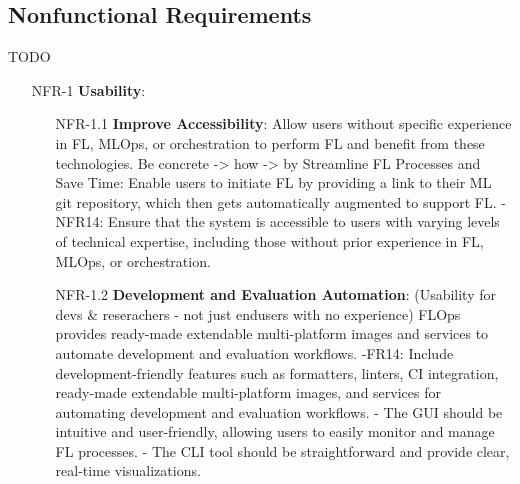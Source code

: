 \subsection{Nonfunctional Requirements}
TODO

\begin{itemize}
    \item [NFR-1] {\textbf{Usability}}:
        \begin{itemize}
        \item [NFR-1.1] \textbf{Improve Accessibility}:
            Allow users without specific experience in FL, MLOps, or orchestration to perform FL and benefit from these technologies.
            Be concrete -> how     
            -> by Streamline FL Processes and Save Time:
            Enable users to initiate FL by providing a link to their ML git repository, which then gets automatically augmented to support FL.
            - NFR14: Ensure that the system is accessible to users with varying levels of technical expertise, including those without prior experience in FL, MLOps, or orchestration.
        \item [NFR-1.2] \textbf{Development and Evaluation Automation}: (Usability for devs \& reserachers - not just endusers with no experience)
            FLOps provides ready-made extendable multi-platform images and services to automate development and evaluation workflows.    
            -FR14: Include development-friendly features such as formatters, linters, CI integration, ready-made extendable multi-platform images, and services for automating development and evaluation workflows.
            - The GUI should be intuitive and user-friendly, allowing users to easily monitor and manage FL processes.
            - The CLI tool should be straightforward and provide clear, real-time visualizations.


\end{itemize}
\end{itemize}
